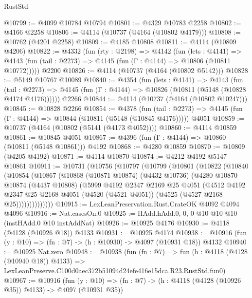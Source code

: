 \begin{lexlean}{RustStd}
\begin{coremodule}
@10799 := @4099 @10784 @10794
@10801 := @4329 @10783 @2258
@10802 := @4166 @2258
@10806 := @4114 (@10737 (@4164 (@10802 @4179)))
@10808 := @10762 (@4201 @2258)
@10809 := @4185 @10808
@10811 := @4114 (@10809 @4206)
@10822 := @4332
    (fun (rty : @2198) =>
    @4142
      (fun (lets : @4141) =>
      @4143 (fun (tail : @2273) => @4145 (fun (Γ : @4144) => @10806 (@10811 @10772)))))
    @2200
@10826 := @4114 (@10737 (@4164 (@10802 @5142)))
@10828 := @5149 @10767 @10089
@10840 := @4354
    (fun (lets : @4141) =>
    @4143
      (fun (tail : @2273) =>
      @4145 (fun (Γ : @4144) => @10826 (@10811 (@5148 (@10828 @4174 @4176))))))
    @2266
@10844 := @4114 (@10737 (@4164 (@10802 @10247)))
@10845 := @10828 @2266
@10854 := @4378
    (fun (tail : @2273) => @4145 (fun (Γ : @4144) => @10844 (@10811 (@5148 (@10845 @4176)))))
    @4051
@10859 := @10737 (@4164 (@10802 (@5141 (@4173 @4052))))
@10860 := @4114 @10859
@10861 := @10845 @4051
@10867 := @4396 (fun (Γ : @4144) => @10860 (@10811 (@5148 @10861))) @4192
@10868 := @4280 @10859
@10870 := @10809 (@4205 @4192)
@10871 := @4114 @10870
@10874 := @4212 @4192 @5147 @10861
@10911 := @10731
    (@10756
      (@10797
        (@10799
          (@10801
            (@10822
              (@10840
                (@10854
                  (@10867
                    (@10868
                      (@10871 @10874)
                      (@4432 @10736)
                      (@4280
                        @10870
                        @10874
                        (@4437 @10808)
                        (@5999
                          @4192
                          @2347
                          @2169
                          @25
                          @4051
                          (@4512
                            @4192
                            @2347
                            @25
                            @2168
                            @4051
                            (@4520 (@4521 @4051))
                            (@4525 (@4527 @2168 @25))))))))))))))
@10915 := LexLeanPreservation.Rust.CrateOK @4092 @4094 @4096
@10916 := Nat.casesOn.{0}
@10925 := HAdd.hAdd.{0, 0, 0} @10 @10 @10 (instHAdd.{0} @10 instAddNat)
@10926 := @10925 @4176
@10930 := @4118 (@4128 (@10926 @18)) @4133
@10931 := @10925 @4174
@10938 := @10916 (fun (y : @10) => (fn : @7) -> (h : @10930) -> @4097 (@10931 @18)) @4132
@10940 := @10925 Nat.zero
@10948 := @10938
    (fun (fn : @7) =>
    fun (h : @4118 (@4128 (@10940 @18)) @4133) =>
    LexLeanPreserve.C100d0aec372b51094d24efe416e15dca.R23.RustStd.fun0)
@10967 := @10916
    (fun (y : @10) => (fn : @7) -> (h : @4118 (@4128 (@10926 @35)) @4133) -> @4097 (@10931 @35))

\end{coremodule}
\end{lexlean}
